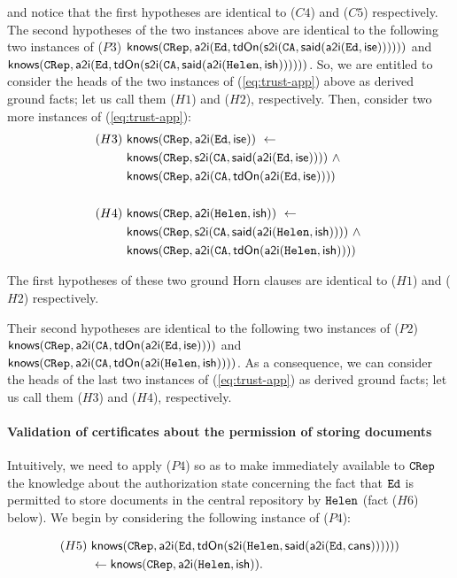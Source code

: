 \documentclass[conference]{llncs}
\newcommand{\theCA}{\ensuremath \mathtt{CA}}
\newcommand{\Ed}{\ensuremath \mathtt{Ed}}
\newcommand{\Helen}{\ensuremath \mathtt{Helen}}
\newcommand{\CRep}{\ensuremath \mathtt{CRep}}
\newcommand{\canstoredoc}{\ensuremath \mathsf{cans}}
\newcommand{\ishead}{\ensuremath \mathsf{ish}}
\newcommand{\isemployee}{\ensuremath \mathsf{ise}}
\newcommand{\know}{\ensuremath \mathsf{knows}}
\newcommand{\atoi}{\ensuremath \mathsf{a2i}}
\newcommand{\stoi}{\ensuremath \mathsf{s2i}}
\newcommand{\said}{\ensuremath \mathsf{said}}
\newcommand{\tdOn}{\ensuremath \mathsf{tdOn}}
\begin{document}
{\noindent 
and notice that the first hypotheses are identical to ($C4$) and ($C5$)
respectively.  The second hypotheses of the two instances above are
identical to the following two instances of ($P3$) $\know(\CRep, \atoi(\Ed,\tdOn(\stoi(\theCA, \said(\atoi(\Ed, \isemployee))))))$ and 
$\know(\CRep, \atoi(\Ed,\tdOn(\stoi(\theCA, \said(\atoi(\Helen, \ishead))))))$.  
So, we are entitled to consider the heads of the two instances of
(\ref{eq:trust-app}) above as derived ground facts; let us call them
($H1$) and ($H2$), respectively.  Then, consider two more instances of
(\ref{eq:trust-app}):
\begin{align*}
   (H3) ~& \know(\CRep,\atoi(\Ed, \isemployee)) ~ \leftarrow \\
   &  \know(\CRep,\stoi(\theCA,\said(\atoi(\Ed, \isemployee)))) ~ \wedge ~ \\
   & \know(\CRep,\atoi(\theCA,\tdOn(\atoi(\Ed, \isemployee))))  \\
   & \\
    (H4) ~ &\know(\CRep,\atoi(\Helen, \ishead)) ~ \leftarrow \\
   &  \know(\CRep,\stoi(\theCA,\said(\atoi(\Helen, \ishead)))) ~ \wedge ~ \\
   &  \know(\CRep,\atoi(\theCA,\tdOn(\atoi(\Helen, \ishead)))) 
\end{align*}

The first hypotheses of these two ground Horn clauses are identical to
($H1$) and ($H2$) respectively. 

Their second hypotheses are
identical to the following two instances of ($P2$) $\know(\CRep, \atoi(\theCA, \tdOn(\atoi(\Ed, \isemployee))))$ and
$\know(\CRep, \atoi(\theCA, \tdOn(\atoi(\Helen, \ishead))))$.
As a consequence, we can consider the heads of the last two instances
of (\ref{eq:trust-app}) as derived ground facts; let us call them 
($H3$) and ($H4$), respectively. 

\paragraph{Validation of certificates about the permission of storing
  documents}  Intuitively, we need to apply ($P4$) so as to make
immediately available to $\CRep$ the knowledge about the authorization
state concerning the fact that $\Ed$ is permitted to store documents
in the central repository by $\Helen$ (fact ($H6$) below).
We begin by considering the following instance of ($P4$):

\begin{small}
\begin{align*}
    (H5) ~ & \know(\CRep, \atoi(\Ed, \tdOn(\stoi(\Helen, \said(\atoi(\Ed, \canstoredoc)))))) \\
    & \leftarrow \know(\CRep, \atoi(\Helen, \ishead)).
\end{align*}
\end{small}

}
\end{document}
